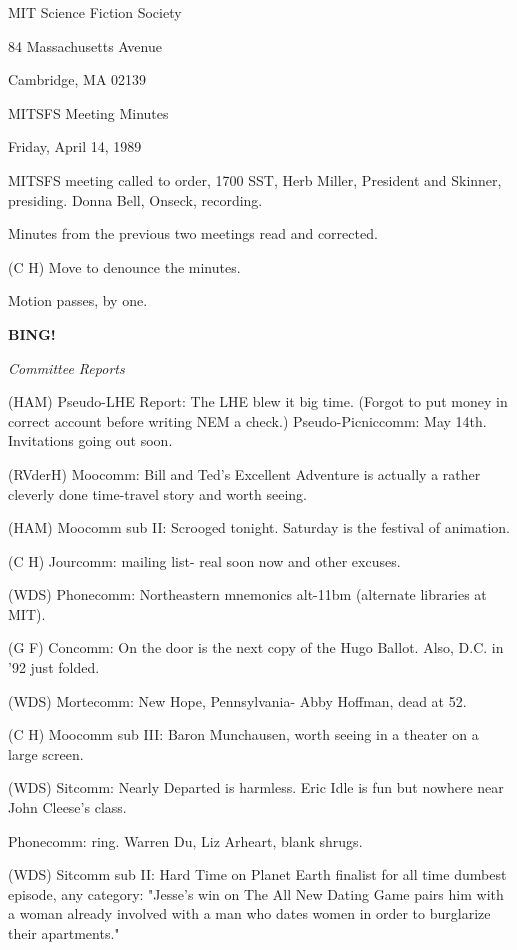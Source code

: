 \documentclass[12pt]{article}
\newcommand{\bing}{{\bf BING!} }
\newcommand{\goto}[1]{\bing \vskip 12pt \centerline{{\em{#1}}}}
\begin{document}
\begin{center}

MIT Science Fiction Society 

84 Massachusetts Avenue

Cambridge, MA 02139

\vspace{12pt}

MITSFS Meeting Minutes 

Friday, April 14, 1989

\end{center}
 
\vspace{18pt}

\setlength{\parskip}{6pt}

\noindent
MITSFS meeting called to order, 1700 SST, Herb Miller, President and Skinner, presiding. Donna Bell, Onseck, recording.

Minutes from the previous two meetings read and corrected.

(C H) Move to denounce the minutes.

Motion passes, by one.

\goto{Committee Reports}

(HAM) Pseudo-LHE Report: The LHE blew it big time. (Forgot to put money in correct account before writing NEM a check.) Pseudo-Picniccomm: May 14th. Invitations going out soon.

(RVderH) Moocomm: Bill and Ted's Excellent Adventure is actually a rather cleverly done time-travel story and worth seeing.

(HAM) Moocomm sub II: Scrooged tonight. Saturday is the festival of animation.

(C H) Jourcomm: mailing list- real soon now and other excuses.

(WDS) Phonecomm: Northeastern mnemonics alt-11bm (alternate libraries at MIT).

(G F) Concomm: On the door is the next copy of the Hugo Ballot. Also, D.C. in '92 just folded.

(WDS) Mortecomm: New Hope, Pennsylvania- Abby Hoffman, dead at 52.

(C H) Moocomm sub III: Baron Munchausen, worth seeing in a theater on a large screen.

(WDS) Sitcomm: Nearly Departed is harmless. Eric Idle is fun but nowhere near John Cleese's class.

Phonecomm: ring. Warren Du, Liz Arheart, blank shrugs.

(WDS) Sitcomm sub II: Hard Time on Planet Earth finalist for all time dumbest episode, any category: "Jesse's win on The All New Dating Game pairs him with a woman already involved with a man who dates women in order to burglarize their apartments."
\end{document}
